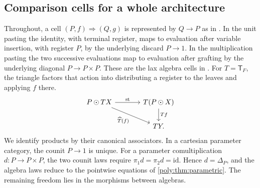 \documentclass[11pt,a4paper]{article}
\theoremstyle{definition}
\theoremstyle{remark}\newaliascnt{remark}{theorem}
\newcommand{\id}{\mathrm{id}}
\numberwithin{equation}{section}
\begin{document}
\subsection{Comparison cells for a whole architecture}
Throughout, a cell $(P,f)\Rightarrow(Q,g)$ is represented by $Q\to P$ as in \cite[Definition G.1]{cdl}. In the unit pasting the identity, with terminal register, maps to evaluation after variable insertion, with register $P$, by the underlying discard $P\to1$. In the multiplication pasting the two successive evaluations map to evaluation after grafting by the underlying diagonal $P\to P\times P$. These are the lax algebra cells in \cite[Definition F.2 and Theorem G.10]{cdl}.
For $T=\mathsf T_F$, the triangle factors that action into distributing a register to the leaves and applying $f$ there.
\[
\begin{tikzcd}[column sep=large]
 P\odot TX\arrow[r,"\mathrm{st}"]\arrow[dr,"{\widehat T(f)}"']&
 T(P\odot X)\arrow[d,"Tf"]\\
 &TY .
\end{tikzcd}
\]
We identify products by their canonical associators. In a cartesian parameter category, the counit $P\to1$ is unique. For a parameter comultiplication $d:P\to P\times P$, the two counit laws require $\pi_1d=\pi_2d=\id$. Hence $d=\Delta_P$, and the algebra laws reduce to the pointwise equations of \cref{poly:thm:parametric}. The remaining freedom lies in the morphisms between algebras.
\end{document}
